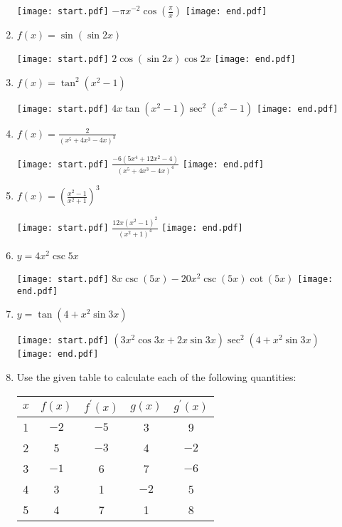 \documentclass[12pt]{article}
\begin{document}
\begin{enumerate}
\texttt{[image: start.pdf]}
{{$-\pi x^{-2}\cos{\left(\frac{\pi}{x}\right)}$}}
\texttt{[image: end.pdf]}


\item $f(x) = \sin{(\sin{2x})}$ 

\texttt{[image: start.pdf]}
{{$2\cos{(\sin{2x})}\cos{2x}$}}
\texttt{[image: end.pdf]}


\item $f(x) = \tan^2{(x^2-1)}$ 

\texttt{[image: start.pdf]}
{{$4x\tan{(x^2-1)}\sec^2{(x^2-1)}$}}
\texttt{[image: end.pdf]}


\item $f(x) = \frac{2}{(x^5+4x^3-4x)^3}$ 

\texttt{[image: start.pdf]}
{{$\frac{-6(5x^4+12x^2-4)}{(x^5+4x^3-4x)^4}$}}
\texttt{[image: end.pdf]}


\item $f(x) = \left(\frac{x^2-1}{x^2+1}\right)^3$ 

\texttt{[image: start.pdf]}
{{$\frac{12x(x^2-1)^2}{(x^2+1)^4}$}}
\texttt{[image: end.pdf]}


\item $y=4x^2\csc{5x}$

\texttt{[image: start.pdf]}
{{$8x\csc{(5x)}-20x^2\csc{(5x)}\cot{(5x)}$}}
\texttt{[image: end.pdf]}


\item $y=\tan{(4+x^2\sin{3x})}$

\texttt{[image: start.pdf]}
{{$\left(3x^2\cos{3x}+2x\sin{3x}\right)\sec^2{\left(4+x^2\sin{3x}\right)}$}}
\texttt{[image: end.pdf]}


\newpage

\item Use the given table to calculate each of the following quantities:

\begin{center}
\begin{tabular}{c|c|c|c|c}
$x$ & $f(x)$ & $f^{\prime}(x)$ & $g(x)$ & $g^{\prime}(x)$\\
\hline
1 & $-2$ & $-5$ & 3 & 9\\
2& 5 & $-3$ & 4 & $-2$\\
3 & $-1$ & 6  & 7 & $-6$\\
4 & 3 & 1 & $-2$ & 5\\
5 & 4 & 7 & 1 & 8
\end{tabular}
\end{center}


\end{enumerate}
\end{document}
